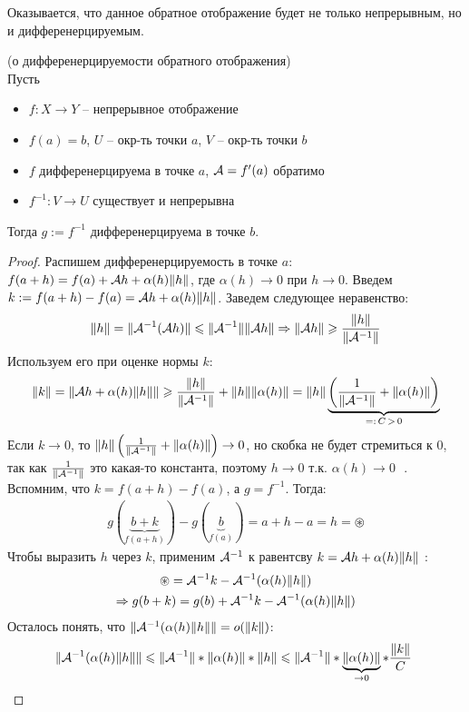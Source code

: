 \vspace*{5mm}

Оказывается, что данное обратное отображение будет не только непрерывным, но и дифференерцируемым.
\begin{theorem} (о дифференерцируемости обратного отображения) \\
    Пусть \begin{itemize}
        \item $f: X \to Y$  -- непрерывное отображение
        \item $f(a) = b$, $U$ -- окр-ть точки $a$, $V$ -- окр-ть точки $b$
        \item $f$ дифференерцируема в точке $a$, $\mathcal{A} = f'(a)$ обратимо
        \item $f^{-1}: V \to U$ существует и непрерывна
    \end{itemize}
    Тогда $g := f^{-1}$ дифференерцируема в точке $b$.
\end{theorem}
\begin{proof}
    Распишем дифференерцируемость в точке $a$: $f(a + h) = f(a) + \mathcal{A} h + \alpha(h)\| h \|$, где $\alpha(h) \to 0$ при $h \to 0$.
    Введем $k := f(a + h) - f(a) = \mathcal{A} h + \alpha(h)\| h \|$. 
    Заведем следующее неравенство: \[ \| h \| = \| \mathcal{A}^{-1}(\mathcal{A} h) \| \leqslant \| \mathcal{A}^{-1} \| \| \mathcal{A} h \| \Rightarrow \| \mathcal{A} h \| \geqslant \frac{\| h \|}{\| \mathcal{A}^{-1} \|} \]
    \quad Используем его при оценке нормы $k$: \[ \| k \| = \| \mathcal{A} h + \alpha(h)\| h \| \| \geqslant \frac{\| h \|}{\| \mathcal{A}^{-1} \|} + \| h \|\|\alpha(h) \| = \| h \| \underbrace{\left(\frac{1}{\| \mathcal{A}^{-1} \|} + \| \alpha(h) \| \right)}_{=:\, C \, > \, 0} \]
    \quad Если $k \to 0$, то $\| h \| \left(\frac{1}{\| \mathcal{A}^{-1} \|} + \| \alpha(h) \| \right) \to 0$, но скобка не будет стремиться к 0, так как $\frac{1}{\| \mathcal{A}^{-1} \|}$ это какая-то константа, поэтому $h \to 0 \text{ т.к. $\alpha(h) \to 0$ }$.
    Вспомним, что $k = f(a+h) - f(a)$, а $g = f^{-1}$. 
    \quad Тогда: \begin{gather*}
        g(\underbrace{b + k}_{f(a+h)}) - g(\underbrace{b}_{f(a)}) = a + h - a = h = \circledast 
    \end{gather*}
    \quad Чтобы выразить $h$ через $k$, применим $\mathcal{A}^{-1}$ к равентсву $k = \mathcal{A} h + \alpha(h)\| h \|$ : \begin{gather*}
        \circledast = \mathcal{A}^{-1}k - \mathcal{A}^{-1}(\alpha(h) \| h \|) \\
        \Rightarrow g(b + k) = g(b) + \mathcal{A}^{-1}k - \mathcal{A}^{-1}(\alpha(h) \| h \|)
    \end{gather*}
    \quad Осталось понять, что $\| \mathcal{A}^{-1}(\alpha(h) \| h \| \| = o(\|k\|)$:
    \[ \| \mathcal{A}^{-1}(\alpha(h) \| h \| \| \leqslant \| \mathcal{A}^{-1} \| * \|\alpha(h) \| * \| h \| \leqslant \| \mathcal{A}^{-1} \| * \underbrace{\|\alpha(h) \|}_{\to 0} * \frac{\|k\|}{C}\  \]
\end{proof}

